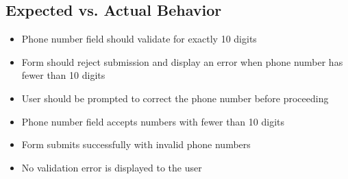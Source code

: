 \subsection*{Expected vs. Actual Behavior}
\begin{tcolorbox}[colback=gray!10, colframe=gray!40, title=Expected Behavior]
\begin{itemize}
    \item Phone number field should validate for exactly 10 digits
    \item Form should reject submission and display an error when phone number has fewer than 10 digits
    \item User should be prompted to correct the phone number before proceeding
\end{itemize}
\end{tcolorbox}
\begin{tcolorbox}[colback=gray!10, colframe=gray!40, title=Actual Behavior]
\begin{itemize}
    \item Phone number field accepts numbers with fewer than 10 digits
    \item Form submits successfully with invalid phone numbers
    \item No validation error is displayed to the user
\end{itemize}
\end{tcolorbox}

